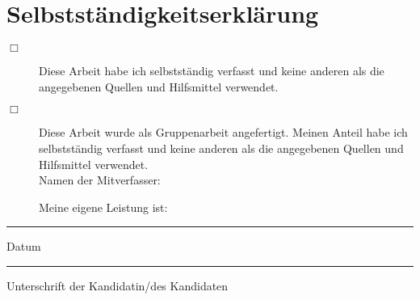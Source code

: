 \chapter{Selbstständigkeitserklärung}

\begin{description}

\item[$\Box$] Diese Arbeit habe ich selbstständig verfasst und keine anderen als die angegebenen Quellen und Hilfsmittel verwendet.\\

\item[$\Box$] Diese Arbeit wurde als Gruppenarbeit angefertigt. Meinen Anteil habe ich selbstständig verfasst und keine anderen als die angegebenen Quellen und Hilfsmittel verwendet.\\

Namen der Mitverfasser:
\vspace{3cm}

Meine eigene Leistung ist:
\vspace{3cm}

\end{description}

\vspace{3cm}

\begin{minipage}[t]{3cm}
	\rule{3cm}{0.5pt}
	Datum
\end{minipage}
\hfill
\begin{minipage}[t]{9cm}
	\rule{9cm}{0.5pt}
	Unterschrift der Kandidatin/des Kandidaten
\end{minipage}
